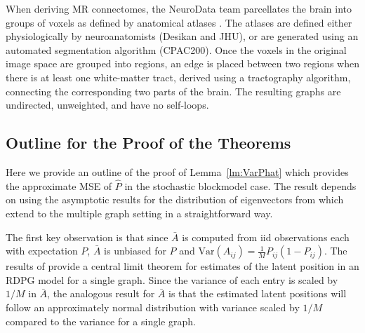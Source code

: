 \documentclass[10pt,letterpaper]{article}
\renewcommand{\hat}{\widehat}
\begin{document}
When deriving MR connectomes, the NeuroData team parcellates the brain into groups of voxels as defined by anatomical atlases \cite{neurodata, kiar2016graph}. The atlases are defined either physiologically by neuroanatomists (Desikan and JHU), or are generated using an automated segmentation algorithm (CPAC200).
Once the voxels in the original image space are grouped into regions, an edge is placed between two regions when there is at least one white-matter tract, derived using a tractography algorithm, connecting the corresponding two parts of the brain.
The resulting graphs are undirected, unweighted, and have no self-loops.


\subsection{Outline for the Proof of the Theorems}
\label{section:outline_proof}
Here we provide an outline of the proof of Lemma~\ref{lm:VarPhat} which provides the approximate MSE of $\hat{P}$ in the stochastic blockmodel case.
The result depends on using the asymptotic results for the distribution of eigenvectors from \cite{athreya2013limit} which extend to the multiple graph setting in a straightforward way.

The first key observation is that since $\bar{A}$ is computed from iid observations each with expectation $P$, $\bar{A}$ is unbiased for $P$ and $\mathrm{Var}(A_{ij}) = \frac{1}{M}P_{ij}(1-P_{ij})$.
The results of \cite{athreya2013limit} provide a central limit theorem for estimates of the latent position in an RDPG model for a single graph.
Since the variance of each entry is scaled by $1/M$ in $\bar{A}$, the analogous result for $\bar{A}$ is that the estimated latent positions will follow an approximately normal distribution with variance scaled by $1/M$ compared to the variance for a single graph. 
    

\end{document}
